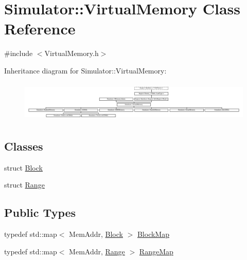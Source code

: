 \hypertarget{class_simulator_1_1_virtual_memory}{\section{Simulator\+:\+:Virtual\+Memory Class Reference}
\label{class_simulator_1_1_virtual_memory}
}


{\ttfamily \#include $<$Virtual\+Memory.\+h$>$}

Inheritance diagram for Simulator\+:\+:Virtual\+Memory\+:\begin{figure}[H]
\begin{center}
\leavevmode
\includegraphics[height=1.964912cm]{class_simulator_1_1_virtual_memory}
\end{center}
\end{figure}
\subsection*{Classes}
\begin{DoxyCompactItemize}
\item 
struct \hyperlink{struct_simulator_1_1_virtual_memory_1_1_block}{Block}
\item 
struct \hyperlink{struct_simulator_1_1_virtual_memory_1_1_range}{Range}
\end{DoxyCompactItemize}
\subsection*{Public Types}
\begin{DoxyCompactItemize}
\item 
typedef std\+::map$<$ Mem\+Addr, \hyperlink{struct_simulator_1_1_virtual_memory_1_1_block}{Block} $>$ \hyperlink{class_simulator_1_1_virtual_memory_ada38033e776f02935cf46de8b0ce7615}{Block\+Map}
\item 
typedef std\+::map$<$ Mem\+Addr, \hyperlink{struct_simulator_1_1_virtual_memory_1_1_range}{Range} $>$ \hyperlink{class_simulator_1_1_virtual_memory_ac7a5d13c3ba7bfcc6729bc4ccbe8bc7e}{Range\+Map}
\end{DoxyCompactItemize}

